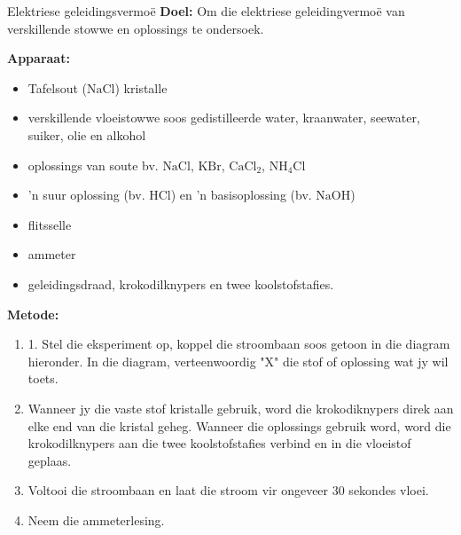             \begin{g_experiment}{Elektriese geleidingsvermo\"{e}}
            \nopagebreak
            \label{m38720*id339425}\noindent{}\textbf{Doel:}
          \newline
Om die elektriese geleidingvermo\"{e} van verskillende stowwe en oplossings te ondersoek.\par 
        \label{m38720*id339438}\noindent{}\textbf{Apparaat:}
\begin{itemize}[noitemsep]
\item Tafelsout ($\text{NaCl}$) kristalle
\item verskillende vloeistowwe soos gedistilleerde water, kraanwater, seewater, suiker, olie en alkohol
\item oplossings van soute bv. $\text{NaCl}$, $\text{KBr}$, $\text{CaCl}_{2}$, $\text{NH}_{4}\text{Cl}$
\item 'n suur oplossing (bv. $\text{HCl}$) en 'n basisoplossing (bv. $\text{NaOH}$)
\item flitsselle
\item ammeter
\item geleidingsdraad, krokodilknypers en twee koolstofstafies.
\end{itemize}
        \label{m38720*eip-456}
	\par
      \label{m38720*id334346}\noindent{}\textbf{Metode:}
\begin{enumerate}[noitemsep, label=\textbf{\arabic*}.]
\item 1. Stel die eksperiment op, koppel die stroombaan soos getoon in die diagram hieronder. In die diagram, verteenwoordig "X" die stof of oplossing wat jy wil toets.
\item Wanneer jy die vaste stof kristalle gebruik, word die krokodiknypers direk aan elke end van die kristal geheg.  Wanneer die oplossings gebruik word, word die krokodilknypers aan die twee koolstofstafies verbind en in die vloeistof geplaas. 
\item Voltooi die stroombaan en laat die stroom vir ongeveer 30 sekondes vloei. 
\item Neem die ammeterlesing.
\end{enumerate}
        \label{m38720*id334362}
\begin{minipage}{.5\textwidth}
    \setcounter{subfigure}{0}
	\begin{figure}[H] %
\begin{center}
\end{center}
\end{figure}
\end{minipage}
\end{g_experiment}
